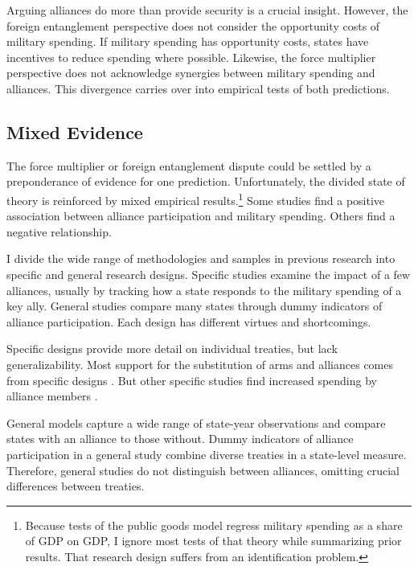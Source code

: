 \documentclass[12pt]{article}
\begin{document}
Arguing alliances do more than provide security is a crucial insight.
However, the foreign entanglement perspective does not consider the opportunity costs of military spending. 
If military spending has opportunity costs, states have incentives to reduce spending where possible.  
Likewise, the force multiplier perspective does not acknowledge synergies between military spending and alliances. 
This divergence carries over into empirical tests of both predictions. 


\subsection{Mixed Evidence} 


The force multiplier or foreign entanglement dispute could be settled by a preponderance of evidence for one prediction. 
Unfortunately, the divided state of theory is reinforced by mixed empirical results.\footnote{Because tests of the public goods model regress military spending as a share of GDP on GDP, I ignore most tests of that theory while summarizing prior results. That research design suffers from an identification problem.}
Some studies find a positive association between alliance participation and military spending. 
Others find a negative relationship. 


I divide the wide range of methodologies and samples in previous research into specific and general research designs.  
Specific studies examine the impact of a few alliances, usually by tracking how a state responds to the military spending of a key ally. 
General studies compare many states through dummy indicators of alliance participation. 
Each design has different virtues and shortcomings. 


Specific designs provide more detail on individual treaties, but lack generalizability. 
Most support for the substitution of arms and alliances comes from specific designs \citep{BarnettLevy1991, Morrow1993, Sorokin1994, PluemperNeumayer2015}. 
But other specific studies find increased spending by alliance members \citep{ConybeareSandler1990, Chenetal1996}. 



General models capture a wide range of state-year observations and compare states with an alliance to those without.
Dummy indicators of alliance participation in a general study combine diverse treaties in a state-level measure. 
Therefore, general studies do not distinguish between alliances, omitting crucial differences between treaties.  
\end{document}
